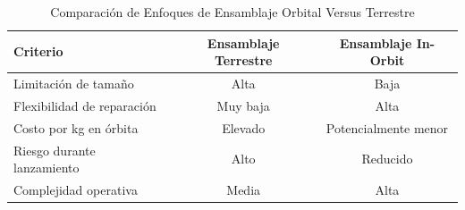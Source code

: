 \begin{table}[!t]
\caption{Comparación de Enfoques de Ensamblaje Orbital Versus Terrestre}
\label{tab:comparacion_enfoques}
\centering
\begin{tabular}{p{2.6cm} c c}
\toprule\textbf{Criterio} & \textbf{Ensamblaje Terrestre} & \textbf{Ensamblaje In-Orbit} \\
\midrule
Limitación de tamaño & Alta & Baja \\
Flexibilidad de reparación & Muy baja & Alta \\
Costo por kg en órbita & Elevado & Potencialmente menor \\
Riesgo durante lanzamiento & Alto & Reducido \\
Complejidad operativa & Media & Alta \\
\bottomrule
\end{tabular}
\end{table}